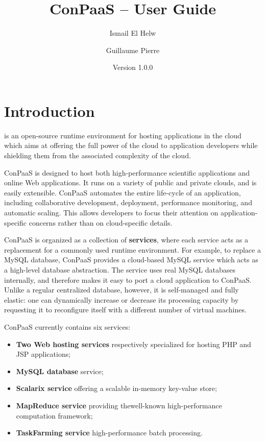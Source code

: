 \documentclass[10pt]{article}
\title{ConPaaS -- User Guide\htmlonly{ [\xml{a href="userguide.pdf"}pdf\xml{/a}]}}
\author{Ismail El Helw \and Guillaume Pierre}
\date{Version 1.0.0}
\begin{document}
\maketitle

\T\vfil
\T\tableofcontents
\T\vfil
\T\newpage

\section{Introduction}

 is an open-source runtime
environment for hosting applications in the cloud which aims at
offering the full power of the cloud to application developers while
shielding them from the associated complexity of the cloud.

ConPaaS is designed to host both high-performance scientific
applications and online Web applications. It runs on a variety of
public and private clouds, and is easily extensible.  ConPaaS
automates the entire life-cycle of an application, including
collaborative development, deployment, performance monitoring, and
automatic scaling. This allows developers to focus their attention on
application-specific concerns rather than on cloud-specific details.

ConPaaS is organized as a collection of \textbf{services}, where each
service acts as a replacement for a commonly used runtime environment.
For example, to replace a MySQL database, ConPaaS provides a
cloud-based MySQL service which acts as a high-level database
abstraction. The service uses real MySQL databases internally, and
therefore makes it easy to port a cloud application to ConPaaS.
Unlike a regular centralized database, however, it is self-managed and
fully elastic: one can dynamically increase or decrease its processing
capacity by requesting it to reconfigure itself with a different
number of virtual machines.

ConPaaS currently contains six services: 

\begin{itemize}
\item \textbf{Two Web hosting services} respectively specialized for
  hosting PHP and JSP applications;
\item \textbf{MySQL database} service;
\item \textbf{Scalarix service} offering a scalable in-memory
  key-value store;
\item \textbf{MapReduce service} providing thewell-known
  high-performance computation framework;
\item \textbf{TaskFarming service} high-performance batch processing.
\end{itemize}
\end{document}
